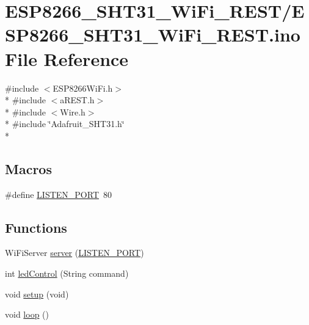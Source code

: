 \hypertarget{ESP8266__SHT31__WiFi__REST_8ino}{\section{E\-S\-P8266\-\_\-\-S\-H\-T31\-\_\-\-Wi\-Fi\-\_\-\-R\-E\-S\-T/\-E\-S\-P8266\-\_\-\-S\-H\-T31\-\_\-\-Wi\-Fi\-\_\-\-R\-E\-S\-T.ino File Reference}
\label{ESP8266__SHT31__WiFi__REST_8ino}
}
{\ttfamily \#include $<$E\-S\-P8266\-Wi\-Fi.\-h$>$}\\*
{\ttfamily \#include $<$a\-R\-E\-S\-T.\-h$>$}\\*
{\ttfamily \#include $<$Wire.\-h$>$}\\*
{\ttfamily \#include \char`\"{}Adafruit\-\_\-\-S\-H\-T31.\-h\char`\"{}}\\*
\subsection*{Macros}
\begin{DoxyCompactItemize}
\item 
\#define \hyperlink{ESP8266__SHT31__WiFi__REST_8ino_a4fba0963c20988d1f1a45afb1c636e44}{L\-I\-S\-T\-E\-N\-\_\-\-P\-O\-R\-T}~80
\end{DoxyCompactItemize}
\subsection*{Functions}
\begin{DoxyCompactItemize}
\item 
Wi\-Fi\-Server \hyperlink{ESP8266__SHT31__WiFi__REST_8ino_a8691743c886a0d380296839329c27751}{server} (\hyperlink{ESP8266__SHT31__WiFi__REST_8ino_a4fba0963c20988d1f1a45afb1c636e44}{L\-I\-S\-T\-E\-N\-\_\-\-P\-O\-R\-T})
\item 
int \hyperlink{ESP8266__SHT31__WiFi__REST_8ino_a01b1eb7723816a74c07b927728202237}{led\-Control} (String command)
\item 
void \hyperlink{ESP8266__SHT31__WiFi__REST_8ino_a7dfd9b79bc5a37d7df40207afbc5431f}{setup} (void)
\item 
void \hyperlink{ESP8266__SHT31__WiFi__REST_8ino_afe461d27b9c48d5921c00d521181f12f}{loop} ()
\end{DoxyCompactItemize}
